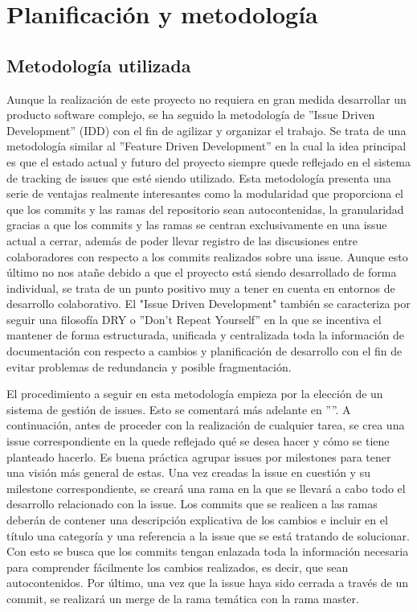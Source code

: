 \chapter{Planificación y metodología}
\label{planificacion}

\section{Metodología utilizada}
\label{metodologia}
Aunque la realización de este proyecto no requiera en gran medida desarrollar un producto software complejo, 
se ha seguido la metodología de ''Issue Driven Development'' (IDD) con el fin de agilizar y organizar el trabajo.
Se trata de una metodología similar al ''Feature Driven Development'' en la cual la idea principal es que el 
estado actual y futuro del proyecto siempre quede reflejado en el sistema de tracking de issues que esté siendo utilizado.
Esta metodología presenta una serie de ventajas realmente interesantes como la modularidad que proporciona el que 
los commits y las ramas del repositorio sean autocontenidas, la granularidad gracias a que los commits y las ramas 
se centran exclusivamente en una issue actual a cerrar, además de poder llevar registro de las discusiones entre 
colaboradores con respecto a los commits realizados sobre una issue. Aunque esto último no nos atañe debido a que 
el proyecto está siendo desarrollado de forma individual, se trata de un punto positivo muy a tener en cuenta en 
entornos de desarrollo colaborativo.
El "Issue Driven Development" también se caracteriza por seguir una filosofía DRY o ''Don't Repeat Yourself'' en 
la que se incentiva el mantener de forma estructurada, unificada y centralizada toda la información de documentación 
con respecto a cambios y planificación de desarrollo con el fin de evitar problemas de redundancia y posible
fragmentación.

El procedimiento a seguir en esta metodología empieza por la elección de un sistema de gestión de issues. Esto se 
comentará más adelante en ''''. A continuación, antes de proceder con la realización de 
cualquier tarea, se crea una issue correspondiente en la quede reflejado qué se desea hacer y cómo se tiene planteado 
hacerlo. Es buena práctica agrupar issues por milestones para tener una visión más general de estas. Una vez 
creadas la issue en cuestión y su milestone correspondiente, se creará una rama en la que se llevará a cabo todo el 
desarrollo relacionado con la issue. Los commits que se realicen a las ramas deberán de contener una descripción 
explicativa de los cambios e incluir en el título una categoría y una referencia a la issue que se está tratando de solucionar. Con 
esto se busca que los commits tengan enlazada toda la información necesaria para comprender fácilmente los cambios 
realizados, es decir, que sean autocontenidos. Por último, una vez que la issue haya sido cerrada a través de un 
commit, se realizará un merge de la rama temática con la rama master.


